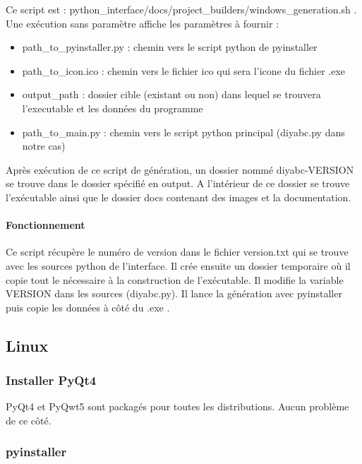 \documentclass[12pt,a4paper]{article}
\begin{document}
        Ce script est : python\_interface/docs/project\_builders/windows\_generation.sh . Une 
        exécution sans paramètre affiche les paramètres à fournir : \\

        \begin{itemize}
            \item path\_to\_pyinstaller.py : chemin vers le script python de pyinstaller
            \item path\_to\_icon.ico : chemin vers le fichier ico qui sera l'icone du fichier .exe
            \item output\_path : dossier cible (existant ou non) dans lequel se trouvera l'executable et les données du programme
            \item path\_to\_main.py : chemin vers le script python principal (diyabc.py dans notre cas)\\
        \end{itemize}

        Après exécution de ce script de génération, un dossier nommé
        diyabc-VERSION se trouve dans le dossier spécifié en output. A
        l'intérieur de ce dossier se trouve l'exécutable ainsi que le dossier
        docs contenant des images et la documentation.

        \paragraph{Fonctionnement}

        Ce script récupère le numéro de version dans le fichier version.txt qui
        se trouve avec les sources python de l'interface. Il crée ensuite un
        dossier temporaire où il copie tout le nécessaire à la construction de
        l'exécutable. Il modifie la variable VERSION dans les sources
        (diyabc.py).  Il lance la génération avec pyinstaller puis copie les
        données à côté du .exe .

    \subsection{Linux}
        \subsubsection{Installer PyQt4}

        PyQt4 et PyQwt5 sont packagés pour toutes les distributions. Aucun
        problème de ce côté.
        \subsubsection{pyinstaller}
\end{document}
